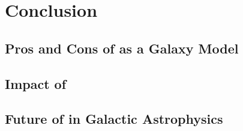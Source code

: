 
\chapter{Conclusion} %
\label{Chapter:Conclusion}

\section{Pros and Cons of \steel as a Galaxy Model}

\section{Impact of \steel}

\section{Future of \steel in Galactic Astrophysics}
